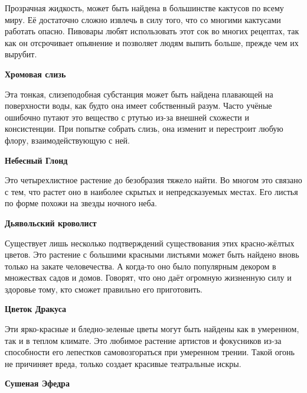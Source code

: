 \documentclass[a4paper, 9pt, twocolumn]{book}
\begin{document}
	\noindent Прозрачная жидкость, может быть найдена в большинстве кактусов по всему миру. Её достаточно сложно извлечь в силу того, что со многими кактусами работать опасно. Пивовары любят использовать этот сок во многих рецептах, так как он отсрочивает опьянение и позволяет людям выпить больше, прежде чем их вырубит.
	
	\medspace 
	
	\noindent \textbf{Хромовая слизь}
	
	\smallskip
	
	\noindent Эта тонкая, слизеподобная субстанция может быть найдена плавающей на поверхности воды, как будто она имеет собственный разум. Часто учёные ошибочно путают это вещество с ртутью из-за внешней схожести и консистенции. При попытке собрать слизь, она изменит и перестроит любую флору, взаимодействующую с ней.
	
	\medspace 
	
	\noindent \textbf{Небесный Глонд}
	
	\smallskip
	
	\noindent Это четырехлистное растение до безобразия тяжело найти. Во многом это связано с тем, что растет оно в наиболее скрытых и непредсказуемых местах. Его листья по форме похожи на звезды ночного неба.
	
	\medspace
	
	\noindent \textbf{Дьявольский кроволист}
	
	\smallskip
	
	\noindent Существует лишь несколько подтверждений существования этих красно-жёлтых цветов. Это растение с большими красными листьями может быть найдено вновь только на закате человечества. А когда-то оно было популярным декором в множествах садов и домов. Говорят, что оно даёт огромную жизненную силу и здоровье тому, кто сможет правильно его приготовить.
	
	\medspace
	
	\noindent \textbf{Цветок Дракуса}
	
	\smallskip
	
	\noindent Эти ярко-красные и бледно-зеленые цветы могут быть найдены как в умеренном, так и в теплом климате. Это любимое растение артистов и фокусников из-за способности его лепестков самовозгораться при умеренном трении. Такой огонь не причиняет вреда, только создает красивые театральные искры.
	
	\medspace 
	
	\noindent \textbf{Сушеная  Эфедра}
	
	\smallskip 
	
\end{document}
